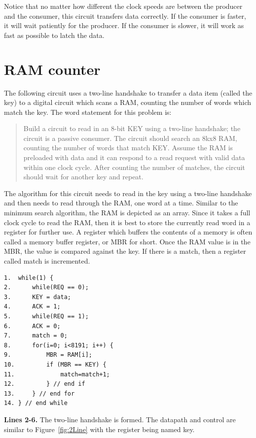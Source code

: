 Notice that no matter how different the clock speeds are between the
producer and the consumer, this circuit transfers data correctly.
If the consumer is faster, it will wait patiently for the producer.
If the consumer is slower, it will work as fast as possible to 
latch the data.  


\section{RAM counter}
The following circuit uses a two-line handshake to transfer a
data item (called the key) to a digital circuit which scans a 
RAM, counting the number of words which match the key.  The word 
statement for this problem is:

\begin{quote}
Build a circuit to read in an 8-bit KEY using a 
two-line handshake; the circuit is a passive consumer.
The circuit should search an 8kx8 RAM, counting the number
of words that match KEY.  Assume the RAM is
preloaded with data and it can respond to a read
request with valid data within one clock cycle.  After 
counting the number of matches, the circuit should wait 
for another key and repeat.
\end{quote}

The algorithm for this circuit needs to read in the key using
a two-line handshake and then needs to read through the RAM, one word
at a time.  Similar to the minimum search algorithm, the
RAM is depicted as an array.  Since it takes a full 
clock cycle to read the
RAM, then it is best to store the currently read word in a 
register for further use.  A register which buffers the contents
of a memory is often called a memory buffer register, or MBR
for short.  Once the RAM value is in the MBR, the value is compared
against the key.  If there is a match, then a register called
match is incremented.

\begin{verbatim}
1.  while(1) {
2.      while(REQ == 0);
3.      KEY = data;
4.      ACK = 1;
5.      while(REQ == 1);
6.      ACK = 0;
7.      match = 0;
8.      for(i=0; i<8191; i++) {
9.          MBR = RAM[i]; 
10.         if (MBR == KEY) {
11.             match=match+1;
12.         } // end if
13.     } // end for 
14. } // end while
\end{verbatim}

{\bf Lines 2-6.} The two-line handshake is formed.  The datapath and control
are similar to Figure~\ref{fig:2Line} with the register being 
named key.

